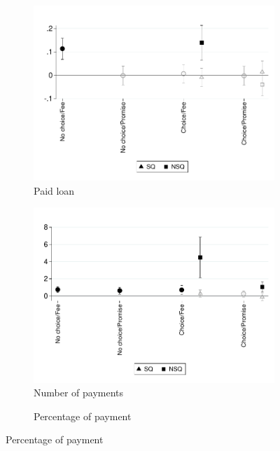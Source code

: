 \documentclass[11pt]{article}
\begin{document}
\begin{figure}[H]
    \caption{Treatment Effect}
    \label{Treatment Effect}
    \begin{center}
    \begin{subfigure}{0.4\textwidth}
        \caption{Paid loan}
        \centering
        \includegraphics[width=\textwidth]{Figuras/te_graph_des_c.pdf}
    \end{subfigure}
    \begin{subfigure}{0.4\textwidth}
        \caption{Number of payments}
        \centering
        \includegraphics[width=\textwidth]{Figuras/te_graph_num_p.pdf}
    \end{subfigure}
     \begin{subfigure}{0.4\textwidth}
      \caption{Percentage of payment}

\end{subfigure}
\end{center}
\end{figure}
\end{document}

